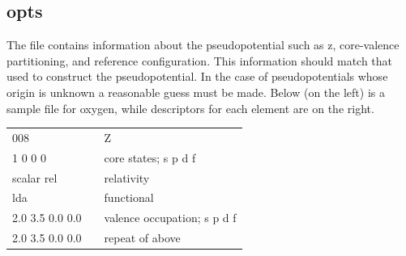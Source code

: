 \documentclass[11pt]{report}
\begin{document}


\subsection{opts}
\label{opts}
The  file contains information about the pseudopotential such as z, core-valence partitioning, and reference configuration. This information should match that used to construct the pseudopotential. In the case of pseudopotentials 
whose origin is unknown a reasonable guess must be made. Below (on the left) is a sample  file for oxygen, while descriptors for each element are on the right.

\begin{center}
\begin{tabular}{| l | c l |}
\hline
008				& &  Z\\
1 0 0 0			& & core states; s p d f \\
scalar rel			& & relativity \\
lda				& & functional \\
2.0 3.5 0.0 0.0		& & valence occupation; s p d f \\
2.0 3.5 0.0 0.0		& & repeat of above \\
\hline
\end{tabular}
\end{center}
\end{document}
